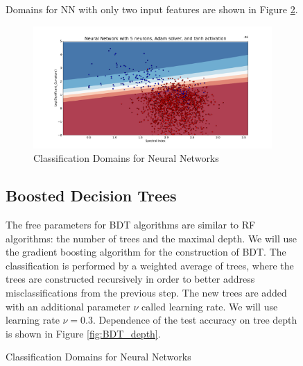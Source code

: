 \begin{figure}[h]
Domains for NN with only two input features are shown in Figure \ref{fig:NN_domains}.


\begin{figure}[h]
\includegraphics[width=\twopicsp\textwidth]{plots/classdom_nn_200_adam_tanh_5.pdf}
\caption{Classification Domains for Neural Networks}
\label{fig:NN_domains}
\end{figure}

\subsection{Boosted Decision Trees}

The free parameters for BDT algorithms are similar to RF algorithms: the number of trees and the maximal depth.
We will use the gradient boosting algorithm for the construction of BDT.
The classification is performed by a weighted average of trees, where the trees are constructed recursively in order to better address 
misclassifications from the previous step. The new trees are added with an additional parameter $\nu$ called learning rate.
We will use learning rate $\nu = 0.3$.
Dependence of the test accuracy on tree depth is shown in Figure \ref{fig:BDT_depth}.


\end{figure}
